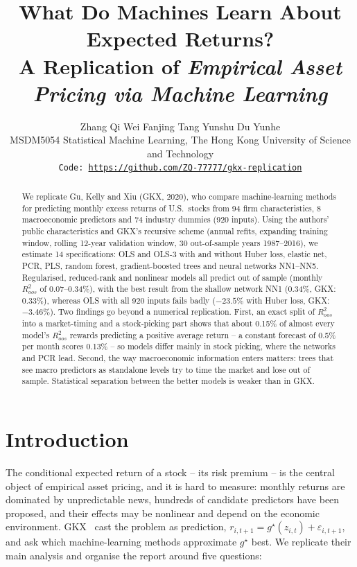 \documentclass[10pt]{article}
\title{What Do Machines Learn About Expected Returns?\\A Replication of \emph{Empirical Asset Pricing via Machine Learning}}
\author{%
  Zhang Qi \qquad Wei Fanjing \qquad Tang Yunshu \qquad Du Yunhe\\
  MSDM5054 Statistical Machine Learning, The Hong Kong University of Science and Technology\\
  \texttt{Code: \url{https://github.com/ZQ-77777/gkx-replication}}
}
\begin{document}
\maketitle

\begin{abstract}
We replicate Gu, Kelly and Xiu (GKX, 2020), who compare machine-learning methods for predicting monthly excess returns of
U.S.\ stocks from 94 firm characteristics, 8 macroeconomic predictors and 74 industry dummies (920 inputs). Using the
authors' public characteristics and GKX's recursive scheme (annual refits, expanding training window, rolling 12-year
validation window, 30 out-of-sample years 1987--2016), we estimate 14 specifications: OLS and OLS-3 with and without Huber
loss, elastic net, PCR, PLS, random forest, gradient-boosted trees and neural networks NN1--NN5. Regularised, reduced-rank
and nonlinear models all predict out of sample (monthly $R^2_{oos}$ of 0.07--0.34\%), with the best result from the
shallow network NN1 (0.34\%, GKX: 0.33\%), whereas OLS with all 920 inputs fails badly ($-23.5\%$ with Huber loss,
GKX: $-3.46\%$). Two findings go beyond a numerical replication. First, an exact split of $R^2_{oos}$ into a
market-timing and a stock-picking part shows that about 0.15\% of almost every model's $R^2_{oos}$ rewards predicting a
positive average return -- a constant forecast of 0.5\% per month scores 0.13\% -- so models differ mainly in stock
picking, where the networks and PCR lead. Second, the way macroeconomic information enters matters: trees that see macro
predictors as standalone levels try to time the market and lose out of sample. Statistical separation between the better
models is weaker than in GKX.
\end{abstract}

\section{Introduction}
The conditional expected return of a stock -- its risk premium -- is the central object of empirical asset pricing, and it
is hard to measure: monthly returns are dominated by unpredictable news, hundreds of candidate predictors have been
proposed, and their effects may be nonlinear and depend on the economic environment. GKX~\cite{gkx} cast the problem as
prediction, $r_{i,t+1}=g^\star(z_{i,t})+\varepsilon_{i,t+1}$, and ask which machine-learning methods approximate $g^\star$
best. We replicate their main analysis and organise the report around five questions:
\end{document}
